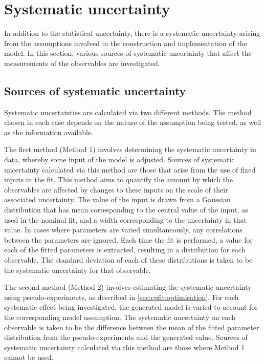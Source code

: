 
\section{Systematic uncertainty}
\label{sec:systematics}

In addition to the statistical uncertainty, there is a systematic uncertainty arising from the assumptions involved in the construction and implementation of the model. In this section, various sources of systematic uncertainty that affect the measurements of the \CP observables are investigated. 

\subsection{Sources of systematic uncertainty}

Systematic uncertainties are calculated via two different methods. The method chosen in each case depends on the nature of the assumption being tested, as well as the information available. 

The first method (Method 1) involves determining the systematic uncertainty in data, whereby some input of the model is adjusted. Sources of systematic uncertainty calculated via this method are those that arise from the use of fixed inputs in the \CP fit. This method aims to quantify the amount by which the \CP observables are affected by changes to these inputs on the scale of their associated uncertainty. The value of the input is drawn from a Gaussian distribution that has mean corresponding to the central value of the input, as used in the nominal fit, and a width corresponding to the uncertainty in that value. In cases where parameters are varied simultaneously, any correlations between the parameters are ignored. Each time the \CP fit is performed, a value for each of the fitted parameters is extracted, resulting in a distribution for each \CP observable. The standard deviation of each of these distributions is taken to be the systematic uncertainty for that \CP observable. 

The second method (Method 2) involves estimating the systematic uncertainty using pseudo-experiments, as described in \sect\ref{sec:cpfit:optimisation}. For each systematic effect being investigated, the generated model is varied to account for the corresponding model assumption. The systematic uncertainty on each observable is taken to be the difference between the mean of the fitted parameter distribution from the pseudo-experiments and the generated value. Sources of systematic uncertainty calculated via this method are those where Method 1 cannot be used.

